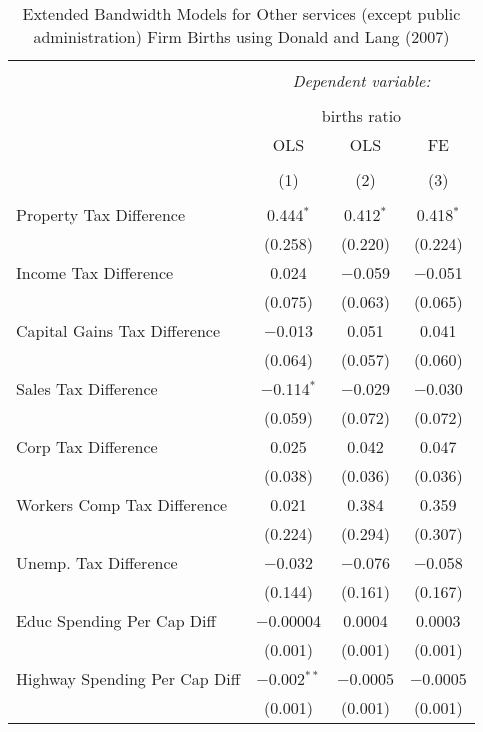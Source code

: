 
\begin{table}[!htbp] \centering 
  \caption{Extended Bandwidth Models for  Other services (except public administration) Firm Births using Donald and Lang (2007)} 
  \label{} 
\begin{tabular}{@{\extracolsep{5pt}}lccc} 
\\[-1.8ex]\hline 
\hline \\[-1.8ex] 
 & \multicolumn{3}{c}{\textit{Dependent variable:}} \\ 
\cline{2-4} 
\\[-1.8ex] & \multicolumn{3}{c}{births ratio} \\ 
 & OLS & OLS & FE \\ 
\\[-1.8ex] & (1) & (2) & (3)\\ 
\hline \\[-1.8ex] 
 Property Tax Difference & 0.444$^{*}$ & 0.412$^{*}$ & 0.418$^{*}$ \\ 
  & (0.258) & (0.220) & (0.224) \\ 
  Income Tax Difference & 0.024 & $-$0.059 & $-$0.051 \\ 
  & (0.075) & (0.063) & (0.065) \\ 
  Capital Gains Tax Difference & $-$0.013 & 0.051 & 0.041 \\ 
  & (0.064) & (0.057) & (0.060) \\ 
  Sales Tax Difference & $-$0.114$^{*}$ & $-$0.029 & $-$0.030 \\ 
  & (0.059) & (0.072) & (0.072) \\ 
  Corp Tax Difference & 0.025 & 0.042 & 0.047 \\ 
  & (0.038) & (0.036) & (0.036) \\ 
  Workers Comp Tax Difference & 0.021 & 0.384 & 0.359 \\ 
  & (0.224) & (0.294) & (0.307) \\ 
  Unemp. Tax Difference & $-$0.032 & $-$0.076 & $-$0.058 \\ 
  & (0.144) & (0.161) & (0.167) \\ 
  Educ Spending Per Cap Diff & $-$0.00004 & 0.0004 & 0.0003 \\ 
  & (0.001) & (0.001) & (0.001) \\ 
  Highway Spending Per Cap Diff & $-$0.002$^{**}$ & $-$0.0005 & $-$0.0005 \\ 
  & (0.001) & (0.001) & (0.001) \\ 

\end{tabular}
\end{table}
